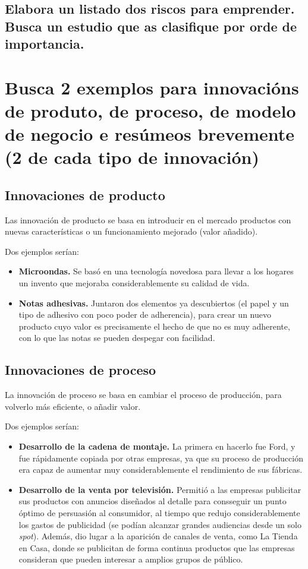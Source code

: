 \documentclass[a4paper]{article}
\begin{document}
\subsection{Elabora un listado dos riscos para emprender. Busca un estudio que as clasifique por orde de importancia.}

\section{Busca 2 exemplos para innovacións de produto, de proceso, de modelo de negocio e resúmeos brevemente (2 de cada tipo de innovación)}

\subsection{Innovaciones de producto}
Las innovación de producto se basa en introducir en el mercado productos con nuevas características o un funcionamiento mejorado (valor añadido).

Dos ejemplos serían:
\begin{itemize}
    \item \textbf{Microondas.} Se basó en una tecnología novedosa para llevar a los hogares un invento que mejoraba considerablemente su calidad de vida.
    \item \textbf{Notas adhesivas.} Juntaron dos elementos ya descubiertos (el papel y un tipo de adhesivo con poco poder de adherencia), para crear un nuevo producto cuyo valor es precisamente el hecho de que no es muy adherente, con lo que las notas se pueden despegar con facilidad.
\end{itemize}

\subsection{Innovaciones de proceso}
La innovación de proceso se basa en cambiar el proceso de producción, para volverlo más eficiente, o añadir valor.

Dos ejemplos serían:
\begin{itemize}
    \item \textbf{Desarrollo de la cadena de montaje.} La primera en hacerlo fue Ford, y fue rápidamente copiada por otras empresas, ya que su proceso de producción era capaz de aumentar muy considerablemente el rendimiento de sus fábricas.
    \item \textbf{Desarrollo de la venta por televisión.} Permitió a las empresas publicitar sus productos con anuncios diseñados al detalle para consseguir un punto óptimo de persuasión al consumidor, al tiempo que redujo considerablemente los gastos de publicidad (se podían alcanzar grandes audiencias desde un solo \textit{spot}). Además, dio lugar a la aparición de canales de venta, como La Tienda en Casa, donde se publicitan de forma continua productos que las empresas consideran que pueden interesar a amplios grupos de público.
\end{itemize}
\end{document}
